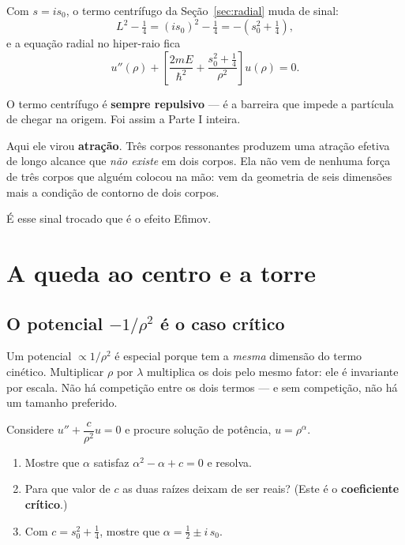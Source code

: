 \documentclass[11pt,a4paper]{article}
\begin{document}
Com $s = is_{0}$, o termo centrífugo da Seção~\ref{sec:radial} muda de sinal:
\begin{equation}
L^{2}-\tfrac14 = (is_{0})^{2}-\tfrac14 = -\left(s_{0}^{2}+\tfrac14\right),
\end{equation}
e a equação radial no hiper-raio fica
\begin{equation}
\boxed{\;u''(\rho) + \left[\frac{2mE}{\hbar^{2}}
+ \frac{s_{0}^{2}+\tfrac14}{\rho^{2}}\right]u(\rho)=0.\;}
\label{eq:efimov}
\end{equation}

\begin{atencao}
O termo centrífugo é \textbf{sempre repulsivo} --- é a barreira que impede a
partícula de chegar na origem. Foi assim a Parte I inteira.

Aqui ele virou \textbf{atração}. Três corpos ressonantes produzem uma atração
efetiva de longo alcance que \emph{não existe} em dois corpos. Ela não vem de nenhuma
força de três corpos que alguém colocou na mão: vem da geometria de seis dimensões
mais a condição de contorno de dois corpos.

É esse sinal trocado que é o efeito Efimov.
\end{atencao}

\section{A queda ao centro e a torre}

\subsection{O potencial \texorpdfstring{$-1/\rho^{2}$}{-1/rho2} é o caso crítico}

Um potencial $\propto 1/\rho^{2}$ é especial porque tem a \emph{mesma} dimensão do
termo cinético. Multiplicar $\rho$ por $\lambda$ multiplica os dois pelo mesmo fator:
ele é invariante por escala. Não há competição entre os dois termos --- e sem
competição, não há um tamanho preferido.

\begin{suavez}
Considere $u'' + \dfrac{c}{\rho^{2}}u = 0$ e procure solução de potência,
$u = \rho^{\alpha}$.
\begin{enumerate}[label=(\alph*), itemsep=2pt]
\item Mostre que $\alpha$ satisfaz $\alpha^{2}-\alpha+c = 0$ e resolva.
\item Para que valor de $c$ as duas raízes deixam de ser reais? (Este é o
      \textbf{coeficiente crítico}.)
\item Com $c = s_{0}^{2}+\tfrac14$, mostre que
      $\alpha = \tfrac12 \pm i\,s_{0}$.
\end{enumerate}

\vspace{2.6cm}
\hrulefill
\end{suavez}
\end{document}
